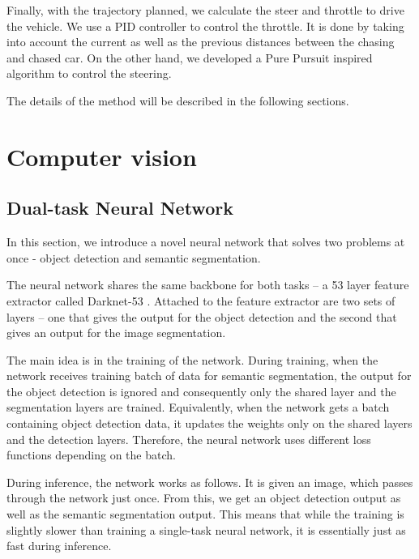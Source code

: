 Finally, with the trajectory planned, we calculate the steer and throttle to drive the vehicle. We use a PID controller \cite{PID_orig} to control the throttle. It is done by taking into account the current as well as the previous distances between the chasing and chased car. On the other hand, we developed a Pure Pursuit \cite{pure_pursuit_orig} inspired algorithm to control the steering. \par

The details of the method will be described in the following sections.




\section{Computer vision}
\subsection{Dual-task Neural Network}
In this section, we introduce a novel neural network that solves two problems at once - object detection and semantic segmentation. \par


The neural network shares the same backbone for both tasks -- a 53 layer feature extractor called Darknet-53 \cite{YOLOv3}. Attached to the feature extractor are two sets of layers -- one that gives the output for the object detection and the second that gives an output for the image segmentation. \par


The main idea is in the training of the network. During training, when the network receives training batch of data for semantic segmentation, the output for the object detection is ignored and consequently only the shared layer and the segmentation layers are trained. Equivalently, when the network gets a batch containing object detection data, it updates the weights only on the shared layers and the detection layers. Therefore, the neural network uses different loss functions depending on the batch. \par


During inference, the network works as follows. It is given an image, which passes through the network just once. From this, we get an object detection output as well as the semantic segmentation output. This means that while the training is slightly slower than training a single-task neural network, it is essentially just as fast during inference. \par


